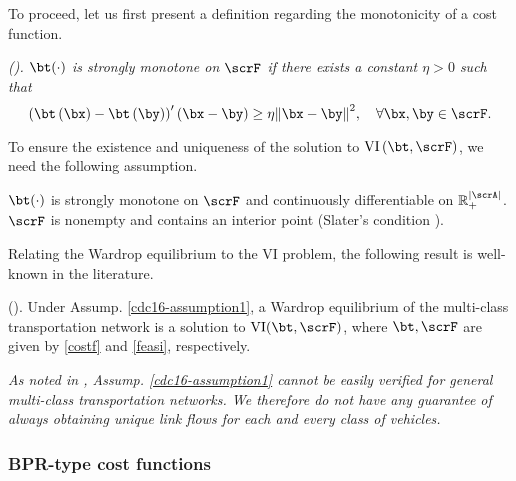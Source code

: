 \documentclass[3p]{elsarticle}
\begin{document}
To proceed, let us first present a definition regarding the monotonicity
of a cost function.
\begin{defi}
\label{journal-def3} \em{(\cite{patriksson1994traffic})}. 
		$\bt(\cdot)$ is \textit{strongly monotone} on $\scrF$ if there exists a constant $\eta > 0$ such that
		\[\left( {\bt\left( \bx \right) - \bt\left( \by \right)} \right)'\left( {\bx - \by} \right) \ge \eta {\left\| {\bx - \by} \right\|^2},\quad \forall \bx,\by \in \scrF.\]
\end{defi}
To ensure the existence and uniqueness of the solution to
$\text{VI}\left( {\bt,\scrF} \right)$, we need the following assumption.
\begin{ass} \label{cdc16-assumption1} $\bt(\cdot)$ is strongly monotone
  on $\scrF$ and continuously differentiable on $\mathbb{R}_ + ^{\left|
      \scrA \right|}$. $\scrF$ is nonempty and contains an interior
  point (Slater's condition \cite{boyd2004convex}).
\end{ass}
	
	
Relating the Wardrop equilibrium to the VI problem, the following result
is well-known in the literature.
\begin{thm} \label{cdc17-th21} (\cite{patriksson1994traffic}).
  \noindent Under Assump. \ref{cdc16-assumption1}, a Wardrop equilibrium
  of the multi-class transportation network is a solution to
  $\text{VI}(\bt,\scrF)$, where $\bt,\scrF$ are given by \eqref{costf}
  and \eqref{feasi}, respectively.
\end{thm}
	
\begin{rmk} \label{rem1} \em{As noted in \cite{noriega2007algorithmic},
    Assump. \ref{cdc16-assumption1} cannot be easily verified for
    general multi-class transportation networks. We therefore do not
    have any guarantee of always obtaining unique link flows for each
    and every class of vehicles.}
\end{rmk}
	
	
	
\subsubsection{BPR-type cost functions} \label{sec:cost}
	
\end{document}
